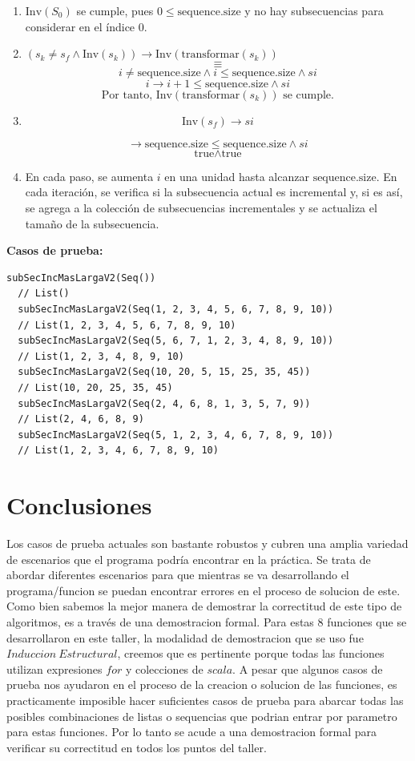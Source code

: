 \documentclass[12pt, a4paper]{article}
\begin{document}
\begin{enumerate}
  \item \( \text{Inv}(S_0) \) se cumple, pues \( 0 \leq \text{sequence.size} \) y no hay subsecuencias para considerar en el índice 0.
  \item \( (s_k \neq s_f \land \text{Inv}(s_k)) \rightarrow \text{Inv}(\text{transformar}(s_k)) \)
  \[\equiv\]
  \[ i \neq \text{sequence.size} \land i \leq \text{sequence.size} \land si  \]
  \[  i \rightarrow i+1 \leq \text{sequence.size} \land si \]
  \[ \text{Por tanto, } \text{Inv}(\text{transformar}(s_k)) \text{ se cumple.} \]
  \item \[ \text{Inv}(s_f) \rightarrow si \] 

  \[\rightarrow \text{sequence.size} \leq \text{sequence.size} \land si  \]
  \[ \text{true} \land \text{true} \]
  \item En cada paso, se aumenta \( i \) en una unidad hasta alcanzar \( \text{sequence.size} \). En cada iteración, se verifica si la subsecuencia actual es incremental y, si es así, se agrega a la colección de subsecuencias incrementales y se actualiza el tamaño de la subsecuencia.
\end{enumerate}
\textbf{Casos de prueba: \\}
\begin{lstlisting}[caption=Casos de prueba para la función subSecIncMasLargaV2, label=lst:scala_code]
  subSecIncMasLargaV2(Seq())
  // List()
  subSecIncMasLargaV2(Seq(1, 2, 3, 4, 5, 6, 7, 8, 9, 10)) 
  // List(1, 2, 3, 4, 5, 6, 7, 8, 9, 10)
  subSecIncMasLargaV2(Seq(5, 6, 7, 1, 2, 3, 4, 8, 9, 10))  
  // List(1, 2, 3, 4, 8, 9, 10)
  subSecIncMasLargaV2(Seq(10, 20, 5, 15, 25, 35, 45))  
  // List(10, 20, 25, 35, 45)
  subSecIncMasLargaV2(Seq(2, 4, 6, 8, 1, 3, 5, 7, 9))  
  // List(2, 4, 6, 8, 9)
  subSecIncMasLargaV2(Seq(5, 1, 2, 3, 4, 6, 7, 8, 9, 10))
  // List(1, 2, 3, 4, 6, 7, 8, 9, 10)
\end{lstlisting}
\section{Conclusiones}
Los casos de prueba actuales son bastante robustos y cubren una amplia variedad de escenarios que el programa podría encontrar en la práctica. Se trata de abordar diferentes escenarios para que mientras se va desarrollando el programa/funcion se puedan encontrar errores en el proceso de solucion de este. Como bien sabemos la mejor manera de demostrar la correctitud de este tipo de algoritmos, es a través de una demostracion formal. Para estas 8 funciones que se desarrollaron en este taller,
la modalidad de demostracion que se uso fue $Induccion~Estructural$, creemos que es pertinente porque todas las funciones utilizan expresiones $for$ y colecciones de $scala$. A pesar que algunos casos de prueba nos ayudaron en el proceso de la creacion o solucion de las funciones, es practicamente imposible hacer suficientes casos de prueba para abarcar todas las posibles combinaciones de listas o sequencias que podrian entrar por parametro para estas funciones. Por lo tanto se acude a una demostracion formal para verificar su correctitud en todos los puntos del taller.
\end{document}
